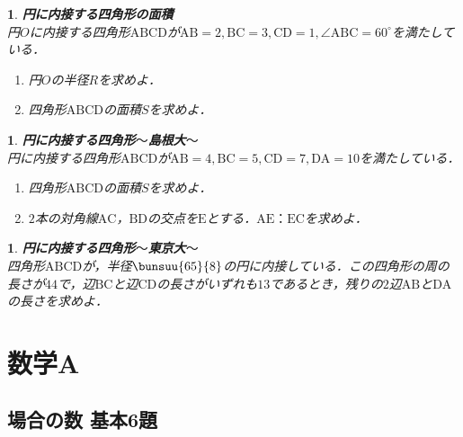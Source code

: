 \documentclass[10pt,
fleqn,
dvipdfmx,
uplatex
]{jsarticle}
\newtheorem{question}[Question]{}
\begin{document}
\begin{question}{\bf\boldmath 円に内接する四角形の面積}\\
円$O$に内接する四角形$\text{ABCD}$が$\text{AB}=2, \text{BC}=3, \text{CD}=1, \angle \text{ABC}={60}^\circ$を満たしている．
\begin{enumerate}
\item 円$O$の半径$R$を求めよ．
\item 四角形$\text{ABCD}$の面積$S$を求めよ．
\end{enumerate}

\end{question}



\begin{question}{\bf\boldmath 円に内接する四角形$〜$島根大$〜$}\\
円に内接する四角形$\text{ABCD}$が$\text{AB}=4, \text{BC}=5, \text{CD}=7, \text{DA}={10}$を満たしている．
\begin{enumerate}
\item 四角形$\text{ABCD}$の面積$S$を求めよ．
\item $2$本の対角線$\text{AC}$，$\text{BD}$の交点を$\text{E}$とする．$\text{AE}：\text{EC}$を求めよ．
\end{enumerate}

\end{question}



\begin{question}{\bf\boldmath 円に内接する四角形$〜$東京大$〜$}\\
四角形$\text{ABCD}$が，半径$\bunsuu{{{65}}}{8}$の円に内接している．この四角形の周の長さが${44}$で，辺$\text{BC}$と辺$\text{CD}$の長さがいずれも${13}$であるとき，残りの$2$辺$\text{AB}$と$\text{DA}$の長さを求めよ．
\end{question}

\section{数学A}

\subsection{場合の数 基本6題}
\end{document}
